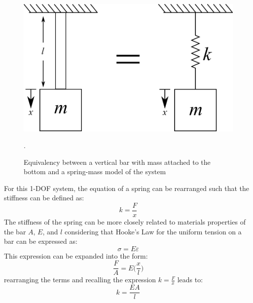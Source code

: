 \documentclass[12pt,letter]{article}
\numberwithin{ex}{section} %
\numberwithin{re}{section} %
\begin{document}
			
			\begin{figure}[H]
				\centering
				\includegraphics[]{../figures/spring_and_bar_mass_vertical.png}
				\caption{Equivalency between a vertical bar with mass attached to the bottom and a spring-mass model of the system}.
				\label{fig:spring_and_bar_mass_vertical}
			\end{figure}
			
			For this 1-DOF system, the equation of a spring can be rearranged such that the stiffness can be defined as:
			\begin{equation}
				k=\frac{F}{x}
			\end{equation}
			The stiffness of the spring can be more closely related to materials properties of the bar $A$, $E$, and $l$ considering that Hooke's Law for the uniform tension on a bar can be expressed as:
			\begin{equation}
				\sigma = E \varepsilon
			\end{equation}			
			This expression can be expanded into the form:
			\begin{equation}
				\frac{F}{A} = E \Big( \frac{x}{l} \Big)
			\end{equation}					
			rearranging the terms and recalling the expression $k = \frac{F}{x}$ leads to:			
			\begin{equation}
				 k = \frac{EA}{l}
			\end{equation}				
		
\end{document}
